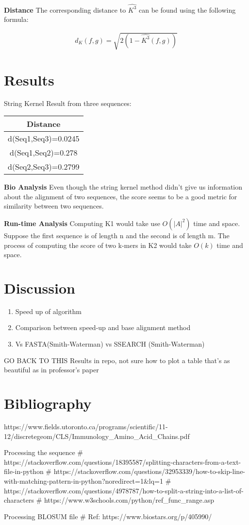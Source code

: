 \documentclass{article}
\begin{document}
\textbf{Distance}
The corresponding distance to $\hat{K^3}$ can be found using the following formula:
\begin{center}
\begin{align*} 
    d_{K}(f,g) = \sqrt{2(1-\hat{K^3}(f,g))}
    \end{align*}
\end{center}

\section{Results}
String Kernel Result from three sequences:
\begin{center}
\begin{tabular}{ |c|} \hline
Distance            \\ \hline
d(Seq1,Seq3)=0.0245 \\ \hline
d(Seq1,Seq2)=0.278  \\ \hline
d(Seq2,Seq3)=0.2799 \\ \hline
\end{tabular}
\end{center}

\par
\textbf{Bio Analysis}
Even though the string kernel method didn’t give us information about the alignment of two sequences, the score seems to be a good metric for similarity between two sequences.

\textbf{Run-time Analysis}
Computing K1 would take use $O(|A|^2)$ time and space. Suppose the first sequence is of length n and the second is of length m. The process of computing the score of two k-mers in K2 would take $O(k)$ time and space. 

\section{Discussion}
\begin{enumerate}
    \item Speed up of algorithm
    \item Comparison between speed-up and base alignment method
    \item Vs FASTA(Smith-Waterman) vs SSEARCH (Smith-Waterman)
\end{enumerate}
GO BACK TO THIS
Results in repo, not sure how to plot a table that’s as beautiful as in professor’s paper


\section{Bibliography}
https://www.fields.utoronto.ca/programs/scientific/11-12/discretegeom/CLS/Immunology_Amino_Acid_Chains.pdf

Processing the sequence
# https://stackoverflow.com/questions/18395587/splitting-characters-from-a-text-file-in-python
# https://stackoverflow.com/questions/32953339/how-to-skip-line-with-matching-pattern-in-python?noredirect=1&lq=1
# https://stackoverflow.com/questions/4978787/how-to-split-a-string-into-a-list-of-characters
# https://www.w3schools.com/python/ref_func_range.asp

Processing BLOSUM file
# Ref: https://www.biostars.org/p/405990/
\end{document}
